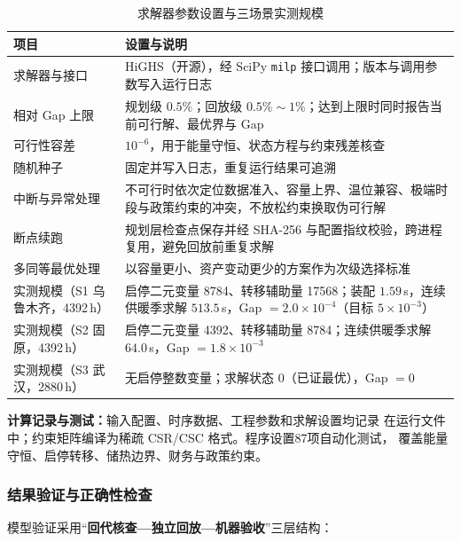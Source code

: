 \begin{table}[H]
  \centering
  \caption{求解器参数设置与三场景实测规模}
  \label{tab:solver}
  \small
  \begin{tabularx}{\textwidth}{lX}
    \toprule
    项目 & 设置与说明 \\
    \midrule
    求解器与接口 & HiGHS（开源），经 SciPy \texttt{milp} 接口调用；版本与调用参数写入运行日志 \\
    相对 Gap 上限 & 规划级 $0.5\%$；回放级 $0.5\%\sim1\%$；达到上限时同时报告当前可行解、最优界与 Gap \\
    可行性容差 & $10^{-6}$，用于能量守恒、状态方程与约束残差核查 \\
    随机种子 & 固定并写入日志，重复运行结果可追溯 \\
    中断与异常处理 & 不可行时依次定位数据准入、容量上界、温位兼容、极端时段与政策约束的冲突，不放松约束换取伪可行解 \\
    断点续跑 & 规划层检查点保存并经 SHA-256 与配置指纹校验，跨进程复用，避免回放前重复求解 \\
    多同等最优处理 & 以容量更小、资产变动更少的方案作为次级选择标准 \\
    \midrule
    实测规模（S1 乌鲁木齐，4392\,h） & 启停二元变量 8784、转移辅助量 17568；装配 $1.59$\,s，连续供暖季求解 $513.5$\,s，Gap $=2.0\times10^{-4}$（目标 $5\times10^{-3}$） \\
    实测规模（S2 固原，4392\,h） & 启停二元变量 4392、转移辅助量 8784；连续供暖季求解 $64.0$\,s，Gap $=1.8\times10^{-3}$ \\
    实测规模（S3 武汉，2880\,h） & 无启停整数变量；求解状态 0（已证最优），Gap $=0$ \\
    \bottomrule
  \end{tabularx}
\end{table}

\textbf{计算记录与测试：}输入配置、时序数据、工程参数和求解设置均记录
在运行文件中；约束矩阵编译为稀疏 CSR/CSC 格式。程序设置87项自动化测试，
覆盖能量守恒、启停转移、储热边界、财务与政策约束。

\subsubsection{结果验证与正确性检查}

模型验证采用“\textbf{回代核查—独立回放—机器验收}”三层结构：

